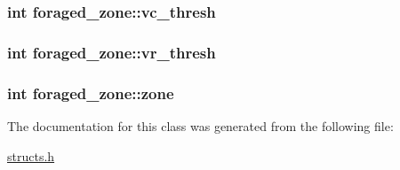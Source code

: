 \hypertarget{classforaged__zone_adb7ad0ba05753a73ecbc9418b4641cb2}{
\subsubsection[{vc\-\_\-thresh}]{\setlength{\rightskip}{0pt plus 5cm}int foraged\-\_\-zone\-::vc\-\_\-thresh}}\label{classforaged__zone_adb7ad0ba05753a73ecbc9418b4641cb2}
\hypertarget{classforaged__zone_aaf94c433bacfbfa03ed5b1a44705d8b5}{
\subsubsection[{vr\-\_\-thresh}]{\setlength{\rightskip}{0pt plus 5cm}int foraged\-\_\-zone\-::vr\-\_\-thresh}}\label{classforaged__zone_aaf94c433bacfbfa03ed5b1a44705d8b5}
\hypertarget{classforaged__zone_ae23acfbf3d49ff927345c86fd9ebdfe8}{
\subsubsection[{zone}]{\setlength{\rightskip}{0pt plus 5cm}int foraged\-\_\-zone\-::zone}}\label{classforaged__zone_ae23acfbf3d49ff927345c86fd9ebdfe8}


The documentation for this class was generated from the following file\-:\begin{DoxyCompactItemize}
\item 
\hyperlink{structs_8h}{structs.\-h}\end{DoxyCompactItemize}
